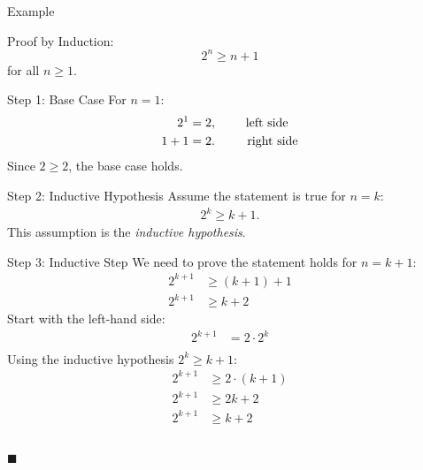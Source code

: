 \documentclass[aspectratio=169]{beamer}
\renewcommand{\qed}{\\ \hfill $\blacksquare$}
\begin{document}
\begin{frame}{Example}
    \begin{exampleblock}{ }
        Proof by Induction:
        $$
            2^n \geq n + 1
        $$
        for all $n \geq 1$.
    \end{exampleblock}
\end{frame}

\begin{frame}{Step 1: Base Case}
    For $n = 1$:
    \begin{align*}
        2^1 &= 2,   \text{\hspace{7mm} left side} \\
        1 + 1 &= 2. \text{\hspace{8mm} right side}
    \end{align*}
    Since $2 \geq 2$, the base case holds. \checkmark
\end{frame}

\begin{frame}{Step 2: Inductive Hypothesis}
    Assume the statement is true for $n = k$:
    \begin{align*}
        2^k \geq k + 1.
    \end{align*}
    This assumption is the \textit{inductive hypothesis}.
\end{frame}

\begin{frame}{Step 3: Inductive Step}
    We need to prove the statement holds for $n = k+1$:
    \scriptsize
    \begin{equation*}
        \begin{split}
            2^{k+1} &\geq (k + 1) + 1 \\
            2^{k+1} &\geq k + 2
        \end{split}
    \end{equation*}
    \pause
    Start with the left-hand side:
    \begin{equation*}
        \begin{split}
            2^{k+1} &= 2 \cdot 2^k \\
        \end{split}
    \end{equation*}
    \pause
    Using the inductive hypothesis $2^k \geq k+1$:
    \begin{equation*}
        \begin{split}
            2^{k+1} &\geq 2 \cdot (k+1) \\
            2^{k+1} &\geq 2k + 2 \\
            2^{k+1} &\geq k + 2 \\
        \end{split}
    \end{equation*}
    \pause
    \qed
\end{frame}
\end{document}
